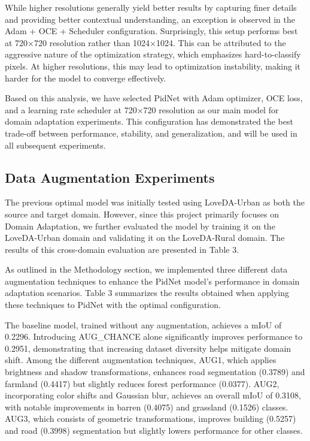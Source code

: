 \documentclass[10pt,twocolumn,letterpaper]{article}
\begin{document}
While higher resolutions generally yield better results by capturing finer details and providing better contextual understanding, an exception is observed in the Adam + OCE + Scheduler configuration. Surprisingly, this setup performs best at 720×720 resolution rather than 1024×1024. This can be attributed to the aggressive nature of the optimization strategy, which emphasizes hard-to-classify pixels. At higher resolutions, this may lead to optimization instability, making it harder for the model to converge effectively.

Based on this analysis, we have selected PidNet with Adam optimizer, OCE loss, and a learning rate scheduler at 720×720 resolution as our main model for domain adaptation experiments. This configuration has demonstrated the best trade-off between performance, stability, and generalization, and will be used in all subsequent experiments.


\subsection{Data Augmentation Experiments}

The previous optimal model was initially tested using LoveDA-Urban as both the source and target domain. However, since this project primarily focuses on Domain Adaptation, we further evaluated the model by training it on the LoveDA-Urban domain and validating it on the LoveDA-Rural domain. The results of this cross-domain evaluation are presented in Table 3.

As outlined in the Methodology section, we implemented three different data augmentation techniques to enhance the PidNet model’s performance in domain adaptation scenarios. Table 3 summarizes the results obtained when applying these techniques to PidNet with the optimal configuration.

The baseline model, trained without any augmentation, achieves a mIoU of 0.2296. Introducing AUG\_CHANCE alone significantly improves performance to 0.2951, demonstrating that increasing dataset diversity helps mitigate domain shift. Among the different augmentation techniques, AUG1, which applies brightness and shadow transformations, enhances road segmentation (0.3789) and farmland (0.4417) but slightly reduces forest performance (0.0377). AUG2, incorporating color shifts and Gaussian blur, achieves an overall mIoU of 0.3108, with notable improvements in barren (0.4075) and grassland (0.1526) classes. AUG3, which consists of geometric transformations, improves building (0.5257) and road (0.3998) segmentation but slightly lowers performance for other classes. 
\end{document}
